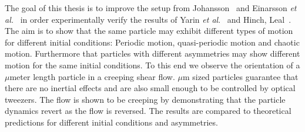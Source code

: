The goal of this thesis is to improve the setup from Johansson~\cite{AntonThesis} and Einarsson \emph{et al.}~\cite{JonasExperiment} in order experimentally verify the results of Yarin \emph{et al}.~\cite{Yarin} and Hinch, Leal~\cite{Leal}. The aim is to show that the same particle may exhibit different types of motion for different initial conditions: Periodic motion, quasi-periodic motion and chaotic motion. Furthermore that particles with different asymmetries may show different motion for the same initial conditions. To this end we observe the orientation of a $\mu$meter length particle in a creeping shear flow. $\mu$m sized particles guarantee that there are no inertial effects and are also small enough to be controlled by optical tweezers. The flow is shown to be creeping by demonstrating that the particle dynamics revert as the flow is reversed. The results are compared to theoretical predictions for different initial conditions and asymmetries.


